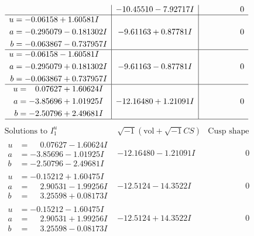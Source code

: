 \documentclass[1p]{elsarticle_modified}
\theoremstyle{definition}
\newcommand{\I}{\sqrt{-1}}
\begin{document}
$$\begin{array}{c|c|c}
 & -10.45510 - 7.92717 I & \phantom{-0.000000 } 0 \\ \hline\begin{aligned}
u &= -0.06158 + 1.60581 I \\
a &= -0.295079 - 0.181302 I \\
b &= -0.063867 - 0.737957 I\end{aligned}
 & -9.61163 + 0.87781 I & \phantom{-0.000000 } 0 \\ \hline\begin{aligned}
u &= -0.06158 - 1.60581 I \\
a &= -0.295079 + 0.181302 I \\
b &= -0.063867 + 0.737957 I\end{aligned}
 & -9.61163 - 0.87781 I & \phantom{-0.000000 } 0 \\ \hline\begin{aligned}
u &= \phantom{-}0.07627 + 1.60624 I \\
a &= -3.85696 + 1.01925 I \\
b &= -2.50796 + 2.49681 I\end{aligned}
 & -12.16480 + 1.21091 I & \phantom{-0.000000 } 0\\
 \hline 
 \end{array}$$\newpage$$\begin{array}{c|c|c}  
\text{Solutions to }I^u_{1}& \I (\text{vol} + \sqrt{-1}CS) & \text{Cusp shape}\\
 \hline 
\begin{aligned}
u &= \phantom{-}0.07627 - 1.60624 I \\
a &= -3.85696 - 1.01925 I \\
b &= -2.50796 - 2.49681 I\end{aligned}
 & -12.16480 - 1.21091 I & \phantom{-0.000000 } 0 \\ \hline\begin{aligned}
u &= -0.15212 + 1.60475 I \\
a &= \phantom{-}2.90531 - 1.99256 I \\
b &= \phantom{-}3.25598 + 0.08173 I\end{aligned}
 & -12.5124 - 14.3522 I & \phantom{-0.000000 } 0 \\ \hline\begin{aligned}
u &= -0.15212 - 1.60475 I \\
a &= \phantom{-}2.90531 + 1.99256 I \\
b &= \phantom{-}3.25598 - 0.08173 I\end{aligned}
 & -12.5124 + 14.3522 I & \phantom{-0.000000 } 0 \\ \hline\begin{aligned}

\end{aligned}
\end{array}$$
\end{document}

